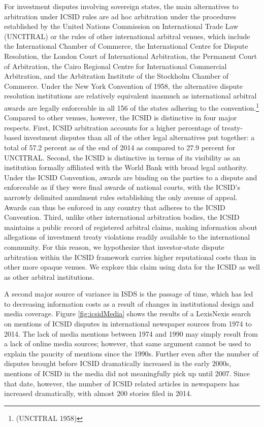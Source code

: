 \documentclass[12pt,onesided]{amsart}
\begin{document}
For investment disputes involving sovereign states, the main alternatives to arbitration under ICSID rules are ad hoc arbitration under the procedures established by the United Nations Commission on International Trade Law (UNCITRAL) or the rules of other international arbitral venues, which include the International Chamber of Commerce, the International Centre for Dispute Resolution, the London Court of International Arbitration, the Permanent Court of Arbitration, the Cairo Regional Centre for International Commercial Arbitration, and the Arbitration Institute of the Stockholm Chamber of Commerce. Under the New York Convention of 1958,  the alternative dispute resolution institutions are relatively equivalent inasmuch as international arbitral awards are legally enforceable in all 156 of the states adhering to the convention.\footnote{(UNCITRAL 1958)} Compared to other venues, however, the ICSID is distinctive in four major respects. First,  ICSID arbitration accounts for a higher percentage of treaty-based investment disputes than all of the other legal alternatives put together: a total of 57.2 percent as of the end of 2014 as compared to 27.9 percent for UNCITRAL. Second, the ICSID is distinctive in terms of its visibility as an institution formally affiliated with the World Bank with broad legal authority. Under the ICSID Convention, awards are binding on the parties to a dispute and enforceable as if they were final awards of national courts, with the ICSID's narrowly delimited annulment rules establishing the only avenue of appeal. Awards can thus be enforced in any country that adheres to the ICSID Convention. Third, unlike other international arbitration bodies, the ICSID maintains a public record of registered arbitral claims, making information about allegations of investment treaty violations readily available to the international community. For this reason, we hypothesize that investor-state dispute arbitration within the ICSID framework carries higher reputational costs than in other more opaque venues. We explore this claim using data for the ICSID as well as other arbitral institutions.

A second major source of variance in ISDS is the passage of time, which has led to decreasing information costs as a result of changes in institutional design and media coverage. Figure \ref{fig:icsidMedia} shows the results of a LexisNexis search on mentions of ICSID disputes in international newspaper sources from 1974 to 2014. The lack of media mentions between 1974 and 1990 may simply result from a lack of online media sources; however, that same argument cannot be used to explain the paucity of mentions since the 1990s. Further even after the number of disputes brought before ICSID dramatically increased in the early 2000s, mentions of ICSID in the media did not meaningfully pick up until 2007. Since that date, however, the number of ICSID related articles in newspapers has increased dramatically, with almost 200 stories filed in 2014. 
\end{document}
